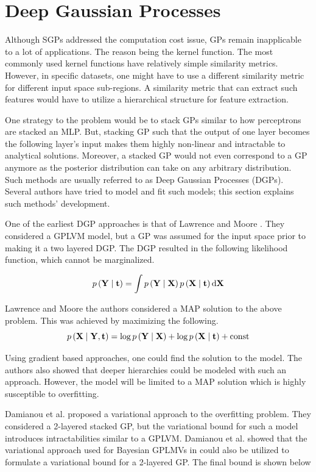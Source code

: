 \documentclass[letterpaper,11pt]{extarticle}
\begin{document}
\section{Deep Gaussian Processes}
Although SGPs addressed the computation cost issue, GPs remain inapplicable to a lot of applications. The reason being the kernel function. The most commonly used kernel functions have relatively simple similarity metrics. However, in specific datasets, one might have to use a different similarity metric for different input space sub-regions. A similarity metric that can extract such features would have to utilize a hierarchical structure for feature extraction. 

One strategy to the problem would be to stack GPs similar to how perceptrons are stacked an MLP. But, stacking GP such that the output of one layer becomes the following layer's input makes them highly non-linear and intractable to analytical solutions. Moreover, a stacked GP would not even correspond to a GP anymore as the posterior distribution can take on any arbitrary distribution. Such methods are usually referred to as Deep Gaussian Processes (DGPs). Several authors have tried to model and fit such models; this section explains such methods' development. 

One of the earliest DGP approaches is that of Lawrence and Moore \cite{LawrenceM07}. They considered a GPLVM model, but a GP was assumed for the input space prior to making it a two layered DGP. The DGP resulted in the following likelihood function, which cannot be marginalized. 

$$
p\left(\mathbf{Y}\mid\mathbf{t}\right) =\int p\left(\mathbf{Y}\mid\mathbf{X}\right) p\left(\mathbf{X}\mid\mathbf{t}\right)\mathrm{d} \mathbf{X} \\
$$

Lawrence and Moore the authors considered a MAP solution to the above problem. This was achieved by maximizing the following. 
$$
p\left(\mathbf{X}\mid\mathbf{Y, t}\right) =\log p\left(\mathbf{Y}\mid\mathbf{X}\right) + \log p\left(\mathbf{X}\mid\mathbf{t}\right) + \text {const} \\
$$

Using gradient based approaches, one could find the solution to the model. The authors also showed that deeper hierarchies could be modeled with such an approach. However, the model will be limited to a MAP solution which is highly susceptible to overfitting.  

Damianou et al. \cite{DamianouTL11} proposed a variational approach to the overfitting problem. They considered a 2-layered stacked GP, but the variational bound for such a model introduces intractabilities similar to a GPLVM.  Damianou et al. showed that the variational approach used for Bayesian GPLMVs in \cite{TitsiasL10} could also be utilized to formulate a variational bound for a 2-layered GP. The final bound is shown below
\end{document}
